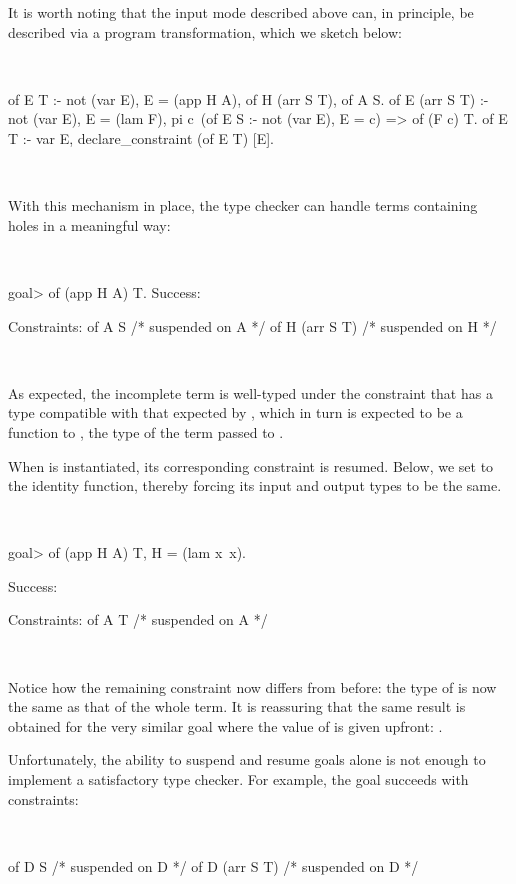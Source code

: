 \documentclass[a4paper, 11pt]{book}
\newenvironment{elpicode}
  {\VerbatimEnvironment~\\\begin{elpibox}\begin{xelpicode}}{\end{xelpicode}
\end{elpibox}\\}
\begin{document}
It is worth noting that the input mode described above can, in principle, be
described via a program transformation, which we sketch below:

\begin{elpicode}
of E T :- not (var E), E = (app H A), of H (arr S T), of A S.
of E (arr S T) :- not (var E), E = (lam F),
  pi c\ (of E S :- not (var E), E = c) => of (F c) T.
of E T :- var E, declare_constraint (of E T) [E].
\end{elpicode}


With this mechanism in place, the type checker can handle terms containing
holes in a meaningful way:

\begin{elpicode}
goal> of (app H A) T.
Success:

Constraints:
  of A S  /* suspended on A */
  of H (arr S T)  /* suspended on H */
\end{elpicode}

As expected, the incomplete term is well-typed under the constraint that
 has a type compatible with that expected by , which in turn
is expected to be a function to , the type of the term passed to
.

When  is instantiated, its corresponding constraint is resumed.
Below, we set  to the identity function, thereby forcing its input
and output types to be the same.

\begin{elpicode}
goal> of (app H A) T, H = (lam x\ x).

Success:

Constraints:
  of A T  /* suspended on A */
\end{elpicode}


Notice how the remaining constraint now differs from before: the type of
 is now the same  as that of the whole term.
It is reassuring that the same result is obtained for the very similar goal
where the value of  is given upfront: .

Unfortunately, the ability to suspend and resume goals alone is not enough to
implement a satisfactory type checker. For example, the goal
 succeeds with constraints:

\begin{elpicode}
  of D S  /* suspended on D */
  of D (arr S T)  /* suspended on D */
\end{elpicode}
\end{document}

